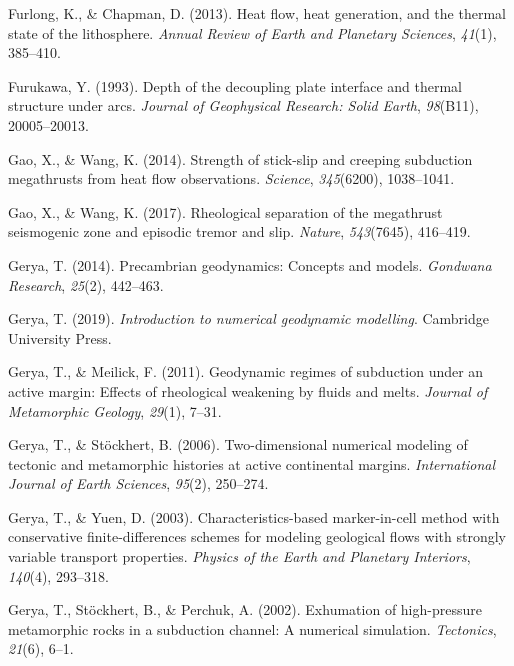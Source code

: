 \begin{CSLReferences}{1}{1}
\leavevmode{}%
Furlong, K., \& Chapman, D. (2013). Heat flow, heat generation, and the thermal state of the lithosphere. \emph{Annual Review of Earth and Planetary Sciences}, \emph{41}(1), 385--410.

\leavevmode{}%
Furukawa, Y. (1993). Depth of the decoupling plate interface and thermal structure under arcs. \emph{Journal of Geophysical Research: Solid Earth}, \emph{98}(B11), 20005--20013.

\leavevmode{}%
Gao, X., \& Wang, K. (2014). Strength of stick-slip and creeping subduction megathrusts from heat flow observations. \emph{Science}, \emph{345}(6200), 1038--1041.

\leavevmode{}%
Gao, X., \& Wang, K. (2017). Rheological separation of the megathrust seismogenic zone and episodic tremor and slip. \emph{Nature}, \emph{543}(7645), 416--419.

\leavevmode{}%
Gerya, T. (2014). Precambrian geodynamics: Concepts and models. \emph{Gondwana Research}, \emph{25}(2), 442--463.

\leavevmode{}%
Gerya, T. (2019). \emph{Introduction to numerical geodynamic modelling}. Cambridge University Press.

\leavevmode{}%
Gerya, T., \& Meilick, F. (2011). Geodynamic regimes of subduction under an active margin: Effects of rheological weakening by fluids and melts. \emph{Journal of Metamorphic Geology}, \emph{29}(1), 7--31.

\leavevmode{}%
Gerya, T., \& Stöckhert, B. (2006). Two-dimensional numerical modeling of tectonic and metamorphic histories at active continental margins. \emph{International Journal of Earth Sciences}, \emph{95}(2), 250--274.

\leavevmode{}%
Gerya, T., \& Yuen, D. (2003). Characteristics-based marker-in-cell method with conservative finite-differences schemes for modeling geological flows with strongly variable transport properties. \emph{Physics of the Earth and Planetary Interiors}, \emph{140}(4), 293--318.

\leavevmode{}%
Gerya, T., Stöckhert, B., \& Perchuk, A. (2002). Exhumation of high-pressure metamorphic rocks in a subduction channel: A numerical simulation. \emph{Tectonics}, \emph{21}(6), 6--1.


\end{CSLReferences}

